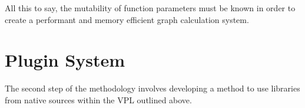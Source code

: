 All this to say, the mutability of function parameters must be known in order to create a performant and memory efficient graph calculation system.  






\newpage
\section{Plugin System} 
\label{sec:method:plugin-system}

The second step of the methodology involves developing a method to use libraries from native sources within the VPL outlined above. 


